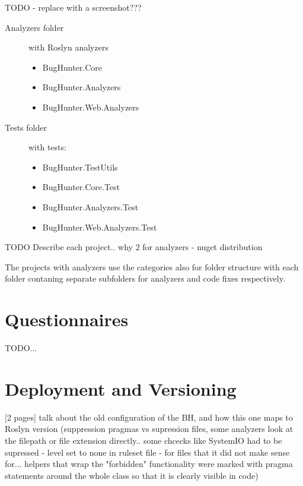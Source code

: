 \documentclass[
  digital, %
  table,   %
  lof,     %
  lot,     %
  oneside,
]{fithesis3}
\begin{document}
TODO - replace with a screenshot???
\begin{description}
  \item[Analyzers folder] with Roslyn analyzers
  \begin{itemize}
    \item BugHunter.Core
    \item BugHunter.Analyzers
    \item BugHunter.Web.Analyzers
  \end{itemize}
  
  \item[Tests folder] with tests:
  \begin{itemize}
    \item BugHunter.TestUtils
    \item BugHunter.Core.Test
    \item BugHunter.Analyzers.Test
    \item BugHunter.Web.Analyzers.Test
  \end{itemize}
\end{description}

TODO Describe each project.. why 2 for analyzers - nuget distribution

The projects with analyzers use the categories also for folder structure with each folder contaning separate subfolders for analyzers and code fixes respectively.
  \chapter{Questionnaires}
TODO...

  \chapter{Deployment and Versioning}
[2 pages]
talk about the old configuration of the BH, and how this one maps to Roslyn version (suppression pragmas vs supression files, some analyzers look at the filepath or file extension directly.. some chcecks like SystemIO had to be supressed - level set to none in ruleset file - for files that it did not make sense for... helpers that wrap the "forbidden" functionality were marked with pragma statements around the whole class so that it is clearly visible in code)
\end{document}
